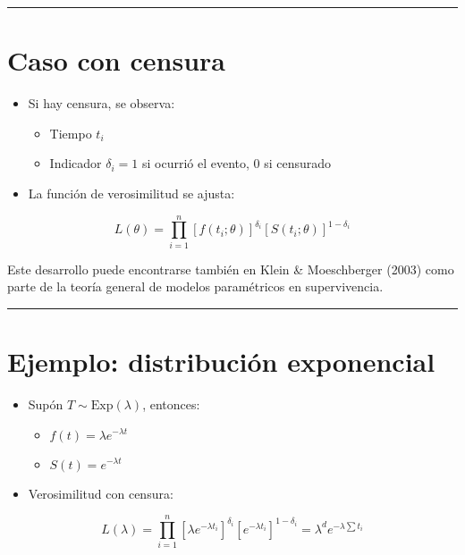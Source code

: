 \documentclass[
]{article}
\providecommand{\tightlist}{%
  \setlength{\itemsep}{0pt}\setlength{\parskip}{0pt}}
\begin{document}
\begin{center}\rule{0.5\linewidth}{0.5pt}\end{center}

\section{Caso con censura}\label{caso-con-censura}

\begin{itemize}
\item
  Si hay censura, se observa:

  \begin{itemize}
  \tightlist
  \item
    Tiempo \(t_i\)
  \item
    Indicador \(\delta_i = 1\) si ocurrió el evento, \(0\) si censurado
  \end{itemize}
\item
  La función de verosimilitud se ajusta:
\end{itemize}

\[
L(\theta) = \prod_{i=1}^n [f(t_i; \theta)]^{\delta_i} [S(t_i; \theta)]^{1 - \delta_i}
\]

Este desarrollo puede encontrarse también en Klein \& Moeschberger
(2003) como parte de la teoría general de modelos paramétricos en
supervivencia.

\begin{center}\rule{0.5\linewidth}{0.5pt}\end{center}

\section{Ejemplo: distribución
exponencial}\label{ejemplo-distribuciuxf3n-exponencial}

\begin{itemize}
\item
  Supón \(T \sim \text{Exp}(\lambda)\), entonces:

  \begin{itemize}
  \tightlist
  \item
    \(f(t) = \lambda e^{-\lambda t}\)
  \item
    \(S(t) = e^{-\lambda t}\)
  \end{itemize}
\item
  Verosimilitud con censura:
\end{itemize}

\[
L(\lambda) = \prod_{i=1}^n [\lambda e^{-\lambda t_i}]^{\delta_i} [e^{-\lambda t_i}]^{1 - \delta_i}
= \lambda^d e^{-\lambda \sum t_i}
\]
\end{document}
